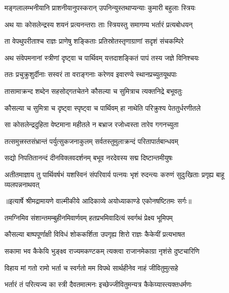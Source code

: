 \twolineshloka
{मङ्गलालम्भनीयानि प्राशनीयानुपस्करान्}
{उपनिन्युस्तथाप्यन्याः कुमारी बहुलाः स्त्रियः} %

\twolineshloka
{अथ याः कोसलेन्द्रस्य शयनं प्रत्यनन्तराः}
{ताः स्त्रियस्तु समागम्य भर्तारं प्रत्यबोधयन्} %

\twolineshloka
{ता वेपथुपरीताश्च राज्ञः प्राणेषु शङ्किताः}
{प्रतिस्रोतस्तृणाग्राणां सदृशं संचकम्पिरे} %

\twolineshloka
{अथ संवेपमनानां स्त्रीणां दृष्ट्वा च पार्थिवम्}
{यत्तदाशङ्कितं पापं तस्य जज्ञे विनिश्चयः} %

\twolineshloka
{ततः प्रचुक्रुशुर्दीनाः सस्वरं ता वराङ्गनाः}
{करेणव इवारण्ये स्थानप्रच्युतयूथपाः} %

\twolineshloka
{तासामाक्रन्द शब्देन सहसोद्गतचेतने}
{कौसल्या च सुमित्राच त्यक्तनिद्रे बभूवतुः} %

\twolineshloka
{कौसल्या च सुमित्रा च दृष्ट्वा स्पृष्ट्वा च पार्थिवम्}
{हा नाथेति परिक्रुश्य पेततुर्धरणीतले} %

\twolineshloka
{सा कोसलेन्द्रदुहिता वेष्टमाना महीतले}
{न बभ्राज रजोध्वस्ता तारेव गगनच्युता} %

\twolineshloka
{तत्समुत्त्रस्तसंभ्रान्तं पर्युत्सुकजनाकुलम्}
{सर्वतस्तुमुलाक्रन्दं परितापार्तबान्धवम्} %

\twolineshloka
{सद्यो निपतितानन्दं दीनविक्लवदर्शनम्}
{बभूव नरदेवस्य सद्म दिष्टान्तमीयुषः} %

\fourlineindentedshloka
{अतीतमाज्ञाय तु पार्थिवर्षभं}
{ यशस्विनं संपरिवार्य पत्नयः}
{भृशं रुदन्त्यः करुणं सुदुःखिताः}
{ प्रगृह्य बाहू व्यलपन्ननाथवत्} %


{॥इत्यार्षे श्रीमद्रामायणे वाल्मीकीये आदिकाव्ये अयोध्याकाण्डे एकोनषष्टितमः सर्गः॥}


\twolineshloka
{तमग्निमिव संशान्तमम्बुहीनमिवार्णवम्}
{हतप्रभमिवादित्यं स्वर्गथं प्रेक्ष्य भूमिपम्} %

\twolineshloka
{कौसल्या बाष्पपूर्णाक्षी विविधं शोककर्शिता}
{उपगृह्य शिरो राज्ञः कैकेयीं प्रत्यभाषत} %

\twolineshloka
{सकामा भव कैकेयि भुङ्क्ष्व राज्यमकण्टकम्}
{त्यक्त्वा राजानमेकाग्रा नृशंसे दुष्टचारिणि} %

\twolineshloka
{विहाय मां गतो रामो भर्ता च स्वर्गतो मम}
{विपथे सार्थहीनेव नाहं जीवितुमुत्सहे} %

\twolineshloka
{भर्तारं तं परित्यज्य का स्त्री दैवतमात्मनः}
{इच्छेज्जीवितुमन्यत्र कैकेय्यास्त्यक्तधर्मणः} %

